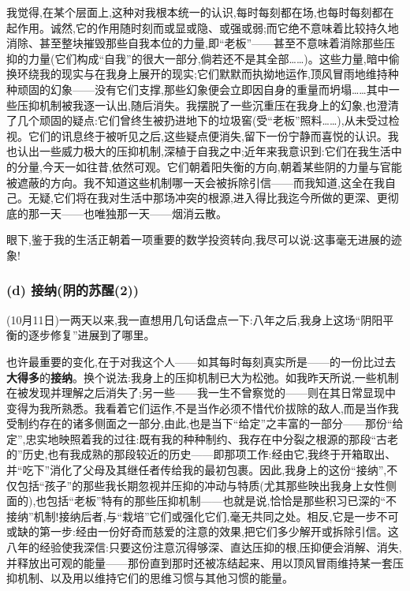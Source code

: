 我觉得,在某个层面上,这种对我根本统一的认识,每时每刻都在场,也每时每刻都在起作用。诚然,它的作用随时刻而或显或隐、或强或弱;而它绝不意味着比较持久地消除、甚至整块摧毁那些自我本位的力量,即“老板”——甚至不意味着消除那些压抑的力量(它们构成“自我”的很大一部分,倘若还不是其全部……)。这些力量,暗中偷换环绕我的现实与在我身上展开的现实;它们默默而执拗地运作,顶风冒雨地维持种种顽固的幻象——没有它们支撑,那些幻象便会立即因自身的重量而坍塌……其中一些压抑机制被我逐一认出,随后消失。我摆脱了一些沉重压在我身上的幻象,也澄清了几个顽固的疑点:它们曾终生被扔进地下的垃圾窖(受“老板”照料……),从未受过检视。它们的讯息终于被听见之后,这些疑点便消失,留下一份宁静而喜悦的认识。我也认出一些威力极大的压抑机制,深植于自我之中;近年来我意识到:它们在我生活中的分量,今天一如往昔,依然可观。它们朝着阳失衡的方向,朝着某些阴的力量与官能被遮蔽的方向。我不知道这些机制哪一天会被拆除引信——而我知道,这全在我自己。无疑,它们将在我对生活中那场冲突的根源,进入得比我迄今所做的更深、更彻底的那一天——也唯独那一天——烟消云散。

眼下,鉴于我的生活正朝着一项重要的数学投资转向,我尽可以说:这事毫无进展的迹象!

\subsubsection*{(d) 接纳(阴的苏醒(2))}
\label{ch18:local:h10}

\label{ch18:local:n10}

\dmark{}(10月11日)一两天以来,我一直想用几句话盘点一下:八年之后,我身上这场“阴阳平衡的逐步修复”进展到了哪里。

也许最重要的变化,在于对我这个人——如其每时每刻真实所是——的一份比过去\textbf{大得多}的\textbf{接纳}。换个说法:我身上的压抑机制已大为松弛。如我昨天所说,一些机制在被发现并理解之后消失了;另一些——我一生不曾察觉的——则在其日常显现中变得为我所熟悉。我看着它们运作,不是当作必须不惜代价拔除的敌人,而是当作我受制约存在的诸多侧面之一部分,由此,也是当下“给定”之丰富的一部分——那份“给定”,忠实地映照着我的过往:既有我的种种制约、我存在中分裂之根源的那段“古老的”历史,也有我成熟的那段较近的历史——即那项工作:经由它,我终于开箱取出、并“吃下”消化了父母及其继任者传给我的最初包裹。因此,我身上的这份“接纳”,不仅包括“孩子”的那些我长期忽视并压抑的冲动与特质(尤其那些映出我身上女性侧面的),也包括“老板”特有的那些压抑机制——也就是说,恰恰是那些积习已深的“不接纳”机制!接纳后者,与“栽培”它们或强化它们,毫无共同之处。相反,它是一步不可或缺的第一步:经由一份好奇而慈爱的注意的效果,把它们多少解开或拆除引信。这八年的经验使我深信:只要这份注意沉得够深、直达压抑的根,压抑便会消解、消失,并释放出可观的能量——那份直到那时还被冻结起来、用以顶风冒雨维持某一套压抑机制、以及用以维持它们的思维习惯与其他习惯的能量。

